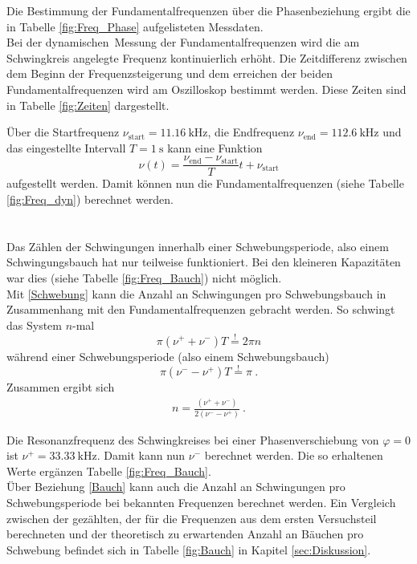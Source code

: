 Die Bestimmung der Fundamentalfrequenzen über die Phasenbeziehung ergibt die in Tabelle \ref{fig:Freq_Phase} aufgelisteten Messdaten.
 \\
Bei der \glqq dynamischen\grqq\ Messung der Fundamentalfrequenzen wird die am Schwingkreis angelegte Frequenz kontinuierlich erhöht. Die Zeitdifferenz zwischen dem Beginn der Frequenzsteigerung und dem erreichen der beiden Fundamentalfrequenzen wird am Oszilloskop bestimmt werden. Diese Zeiten sind in Tabelle \ref{fig:Zeiten} dargestellt.

Über die Startfrequenz $\nu_\text{start} = \SI{11.16}{\kilo\hertz}$, die Endfrequenz $\nu_\text{end} = \SI{112.6}{\kilo\hertz}$ und das eingestellte Intervall $T = \SI{1}{\second}$ kann eine Funktion
\[ \nu(t) = \frac{\nu_\text{end}-\nu_\text{start}}{T}t+\nu_\text{start} \]
aufgestellt werden. Damit können nun die Fundamentalfrequenzen (siehe Tabelle \ref{fig:Freq_dyn}) berechnet werden. \\

\ \\
\ \\
Das Zählen der Schwingungen innerhalb einer Schwebungsperiode, also einem Schwingungsbauch hat nur teilweise funktioniert. Bei den kleineren Kapazitäten war dies (siehe Tabelle \ref{fig:Freq_Bauch}) nicht möglich. \\
Mit \eqref{Schwebung} kann die Anzahl an Schwingungen pro Schwebungsbauch in Zusammenhang mit den Fundamentalfrequenzen gebracht werden. So schwingt das System $n$-mal
\[ \pi(\nu^+ + \nu^-)T \overset{!}{=} 2\pi n \]
während einer Schwebungsperiode (also einem Schwebungsbauch)
\[ \pi(\nu^- - \nu^+)T \overset{!}{=} \pi \ . \]
Zusammen ergibt sich
\begin{align}\label{Bauch}
	n = \frac{(\nu^+ + \nu^-)}{2(\nu^- - \nu^+)} \ .
\end{align}

Die Resonanzfrequenz des Schwingkreises bei einer Phasenverschiebung von $\varphi=0$ ist $\nu^+=\SI{33.33}{\kilo\hertz}$. Damit kann nun $\nu^-$ berechnet werden. Die so erhaltenen Werte ergänzen Tabelle \ref{fig:Freq_Bauch}.
 \\
Über Beziehung \eqref{Bauch} kann auch die Anzahl an Schwingungen pro Schwebungsperiode bei bekannten Frequenzen berechnet werden. Ein Vergleich zwischen der gezählten, der für die Frequenzen aus dem ersten Versuchsteil berechneten und der theoretisch zu erwartenden Anzahl an Bäuchen pro Schwebung befindet sich in Tabelle \ref{fig:Bauch} in Kapitel \ref{sec:Diskussion}.
